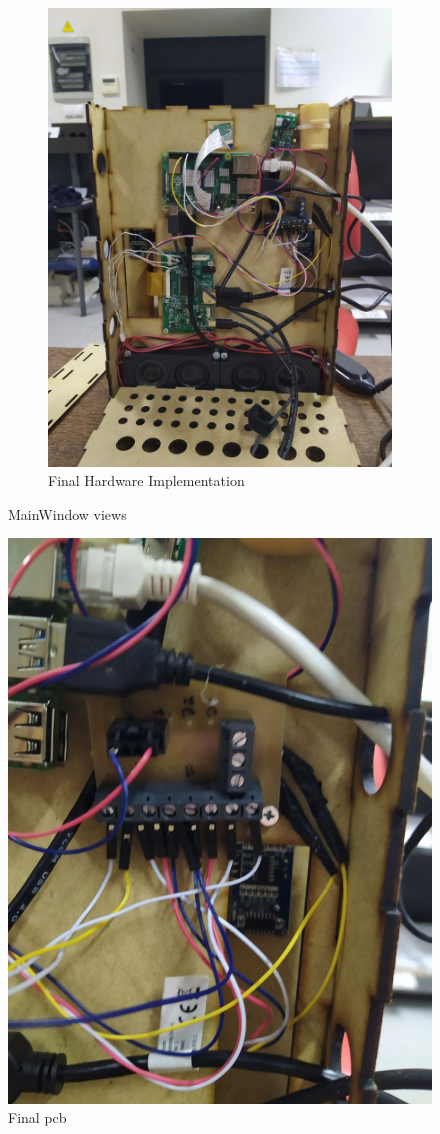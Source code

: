 \begin{figure}
\begin{subfigure}{.4\textwidth}
    \includegraphics[width=\textwidth]{img/hw-inside.jpg}%
  \caption{Final Hardware Implementation}%
  \label{fig:hw-inside}
  \end{subfigure}
  \caption{MainWindow views}%
  \label{fig:hw-imp}
\end{figure}
%
\begin{figure}[!htb]
    \includegraphics[width=.5\textwidth]{img/pcb.jpg}%
  \caption{Final \gls{pcb}}%
  \label{fig:pcb}
  \end{figure}